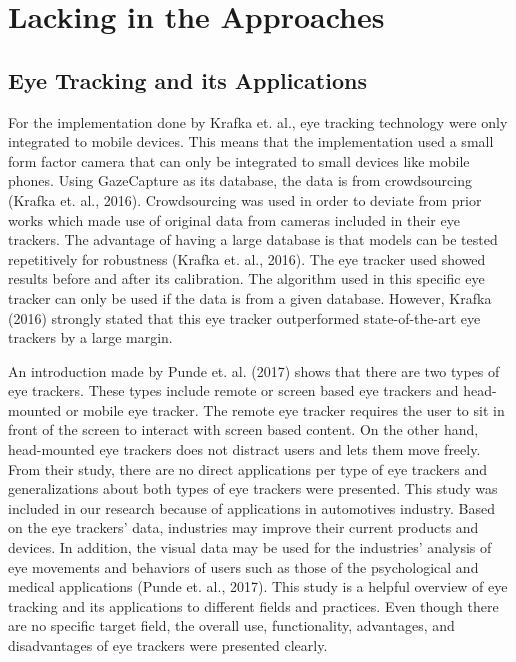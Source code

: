 \section{Lacking in the Approaches}
\subsection{Eye Tracking and its Applications}
  For the implementation done by Krafka et. al., eye tracking technology were only integrated to mobile devices. This means that the implementation used a small form factor camera that can only be integrated to small devices like mobile phones. Using GazeCapture as its database, the data is from crowdsourcing (Krafka et. al., 2016). Crowdsourcing was used in order to deviate from prior works which made use of original data from cameras included in their eye trackers. The advantage of having a large database is that models can be tested repetitively for robustness (Krafka et. al., 2016). The eye tracker used  showed results before and after its calibration. The algorithm used in this specific eye tracker can only be used if the data is from a given database. However, Krafka (2016) strongly stated that this eye tracker outperformed state-of-the-art eye trackers by a large margin.
\newline

An introduction made by Punde et. al. (2017) shows that there are two types of eye trackers. These types include remote or screen based eye trackers and head-mounted or mobile eye tracker. The remote eye tracker requires the user to sit in front of the screen to interact with screen based content. On the other hand, head-mounted eye trackers does not distract users and lets them move freely. From their study, there are no direct applications per type of eye trackers and generalizations about both types of eye trackers were presented. This study was included in our research because of applications in automotives industry. Based on the eye trackers’ data, industries may improve their current products and devices. In addition, the visual data may be used for the industries’ analysis of eye movements and behaviors of users such as those of the psychological and medical applications (Punde et. al., 2017). This study is a helpful overview of eye tracking and its applications to different fields and practices. Even though there are no specific target field, the overall use, functionality, advantages, and disadvantages of eye trackers were presented clearly.
\newline

